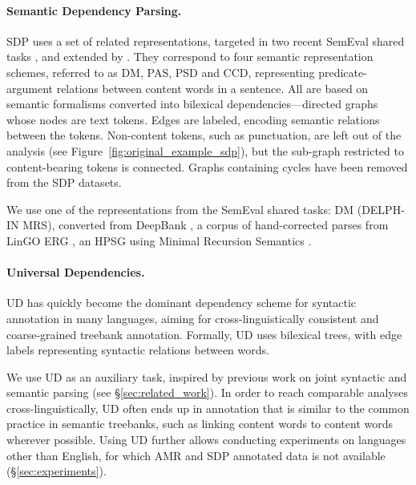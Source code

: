 \documentclass[11pt,a4paper]{article}
\begin{document}
\paragraph{Semantic Dependency Parsing.}\label{sec:sdp}

SDP uses a set of related representations, targeted in two recent SemEval shared tasks 
\cite{oepen2014semeval,oepen2015semeval}, and extended by \citet{oepen2016towards}.
They correspond to four semantic representation schemes, referred to as
DM, PAS, PSD and CCD, representing
predicate-argument relations between content words in a sentence.
All are based on semantic formalisms %
converted into bilexical dependencies---directed graphs whose nodes are text tokens.
Edges are labeled, encoding semantic relations between the tokens.
Non-content tokens, such as punctuation,
are left out of the analysis (see Figure~\ref{fig:original_example_sdp}),
but the sub-graph restricted to content-bearing tokens is connected.
Graphs containing cycles have been removed from the SDP datasets.

We use one of the representations
from the SemEval shared tasks: DM (DELPH-IN MRS), converted from 
DeepBank \cite{flickinger2012deepbank}, a corpus of hand-corrected parses from LinGO
ERG \cite{copestake2000open},
an HPSG \cite{pollard1994head}
using Minimal Recursion Semantics \cite{copestake2005minimal}.


\paragraph{Universal Dependencies.}\label{sec:ud}
UD \cite{nivre2016universal,11234/1-2515} has quickly become
the dominant dependency scheme for
syntactic  annotation in many languages,
aiming for cross-linguistically consistent and coarse-grained treebank
annotation. Formally, UD uses bilexical trees, with edge labels 
representing syntactic relations between words.

We use UD as an auxiliary task,
inspired by previous work on joint syntactic and semantic parsing
(see \S\ref{sec:related_work}).
In order to reach comparable analyses cross-linguistically,
UD often ends up in annotation that is similar to the common practice
in semantic treebanks, such as linking content words to content words wherever possible.
Using UD further allows conducting experiments on languages other than English, 
for which AMR and SDP annotated data is not available (\S\ref{sec:experiments}).
\end{document}
